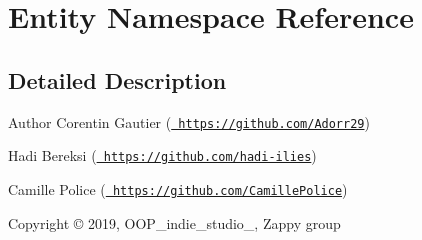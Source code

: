\hypertarget{namespace_entity}{}\section{Entity Namespace Reference}
\label{namespace_entity}


\subsection{Detailed Description}
\begin{DoxyAuthor}{Author}
Corentin Gautier (\href{https://github.com/Adorr29}{\texttt{ https\+://github.\+com/\+Adorr29}}) 

Hadi Bereksi (\href{https://github.com/hadi-ilies}{\texttt{ https\+://github.\+com/hadi-\/ilies}}) 

Camille Police (\href{https://github.com/CamillePolice}{\texttt{ https\+://github.\+com/\+Camille\+Police}}) 
\end{DoxyAuthor}
\begin{DoxyCopyright}{Copyright}
© 2019, O\+O\+P\+\_\+indie\+\_\+studio\+\_, Zappy group 
\end{DoxyCopyright}
